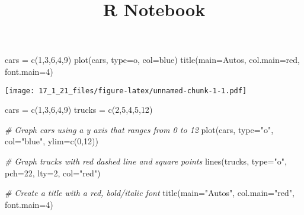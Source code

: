 \documentclass[
]{article}
\title{R Notebook}
\author{}
\date{\vspace{-2.5em}}
\newenvironment{Shaded}{\begin{snugshade}}{\end{snugshade}}
\newcommand{\AttributeTok}[1]{\textcolor[rgb]{0.77,0.63,0.00}{#1}}
\newcommand{\CommentTok}[1]{\textcolor[rgb]{0.56,0.35,0.01}{\textit{#1}}}
\newcommand{\DecValTok}[1]{\textcolor[rgb]{0.00,0.00,0.81}{#1}}
\newcommand{\FunctionTok}[1]{\textcolor[rgb]{0.00,0.00,0.00}{#1}}
\newcommand{\NormalTok}[1]{#1}
\newcommand{\OtherTok}[1]{\textcolor[rgb]{0.56,0.35,0.01}{#1}}
\newcommand{\StringTok}[1]{\textcolor[rgb]{0.31,0.60,0.02}{#1}}
\begin{document}
\maketitle

\begin{Shaded}
\begin{Highlighting}[]
\NormalTok{cars }\OtherTok{=} \FunctionTok{c}\NormalTok{(}\DecValTok{1}\NormalTok{,}\DecValTok{3}\NormalTok{,}\DecValTok{6}\NormalTok{,}\DecValTok{4}\NormalTok{,}\DecValTok{9}\NormalTok{)}
\FunctionTok{plot}\NormalTok{(cars, }\AttributeTok{type=}\StringTok{\textquotesingle{}o\textquotesingle{}}\NormalTok{, }\AttributeTok{col=}\StringTok{\textquotesingle{}blue\textquotesingle{}}\NormalTok{)}
\FunctionTok{title}\NormalTok{(}\AttributeTok{main=}\StringTok{\textquotesingle{}Autos\textquotesingle{}}\NormalTok{, }\AttributeTok{col.main=}\StringTok{\textquotesingle{}red\textquotesingle{}}\NormalTok{, }\AttributeTok{font.main=}\DecValTok{4}\NormalTok{)}
\end{Highlighting}
\end{Shaded}

\texttt{[image: 17\_1\_21\_files/figure-latex/unnamed-chunk-1-1.pdf]}

\begin{Shaded}
\begin{Highlighting}[]
\NormalTok{cars   }\OtherTok{=} \FunctionTok{c}\NormalTok{(}\DecValTok{1}\NormalTok{,}\DecValTok{3}\NormalTok{,}\DecValTok{6}\NormalTok{,}\DecValTok{4}\NormalTok{,}\DecValTok{9}\NormalTok{)}
\NormalTok{trucks }\OtherTok{=} \FunctionTok{c}\NormalTok{(}\DecValTok{2}\NormalTok{,}\DecValTok{5}\NormalTok{,}\DecValTok{4}\NormalTok{,}\DecValTok{5}\NormalTok{,}\DecValTok{12}\NormalTok{)}

\CommentTok{\# Graph cars using a y axis that ranges from 0 to 12}
\FunctionTok{plot}\NormalTok{(cars, }\AttributeTok{type=}\StringTok{"o"}\NormalTok{, }\AttributeTok{col=}\StringTok{"blue"}\NormalTok{, }\AttributeTok{ylim=}\FunctionTok{c}\NormalTok{(}\DecValTok{0}\NormalTok{,}\DecValTok{12}\NormalTok{))}

\CommentTok{\# Graph trucks with red dashed line and square points}
\FunctionTok{lines}\NormalTok{(trucks, }\AttributeTok{type=}\StringTok{"o"}\NormalTok{, }\AttributeTok{pch=}\DecValTok{22}\NormalTok{, }\AttributeTok{lty=}\DecValTok{2}\NormalTok{, }\AttributeTok{col=}\StringTok{"red"}\NormalTok{)}

\CommentTok{\# Create a title with a red, bold/italic font}
\FunctionTok{title}\NormalTok{(}\AttributeTok{main=}\StringTok{"Autos"}\NormalTok{, }\AttributeTok{col.main=}\StringTok{"red"}\NormalTok{, }\AttributeTok{font.main=}\DecValTok{4}\NormalTok{)}
\end{Highlighting}
\end{Shaded}
\end{document}
